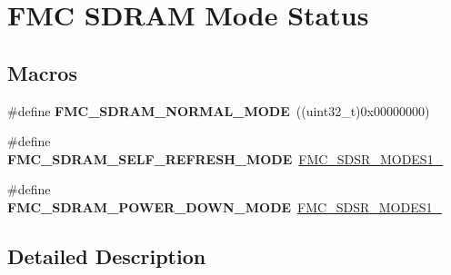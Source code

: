 \hypertarget{group___f_m_c___s_d_r_a_m___mode___status}{}\section{F\+MC S\+D\+R\+AM Mode Status}
\label{group___f_m_c___s_d_r_a_m___mode___status}
\subsection*{Macros}
\begin{DoxyCompactItemize}
\item 
\#define {\bfseries F\+M\+C\+\_\+\+S\+D\+R\+A\+M\+\_\+\+N\+O\+R\+M\+A\+L\+\_\+\+M\+O\+DE}~((uint32\+\_\+t)0x00000000)\hypertarget{group___f_m_c___s_d_r_a_m___mode___status_gab9ee9b57cae6b0db11b17d9ac798d741}{}\label{group___f_m_c___s_d_r_a_m___mode___status_gab9ee9b57cae6b0db11b17d9ac798d741}

\item 
\#define {\bfseries F\+M\+C\+\_\+\+S\+D\+R\+A\+M\+\_\+\+S\+E\+L\+F\+\_\+\+R\+E\+F\+R\+E\+S\+H\+\_\+\+M\+O\+DE}~\hyperlink{group___peripheral___registers___bits___definition_ga3cfebd747cc0903d32a7e34e498ae665}{F\+M\+C\+\_\+\+S\+D\+S\+R\+\_\+\+M\+O\+D\+E\+S1\+\_}\hypertarget{group___f_m_c___s_d_r_a_m___mode___status_ga52e55ef672c1038b560927fffc99d87d}{}\label{group___f_m_c___s_d_r_a_m___mode___status_ga52e55ef672c1038b560927fffc99d87d}

\item 
\#define {\bfseries F\+M\+C\+\_\+\+S\+D\+R\+A\+M\+\_\+\+P\+O\+W\+E\+R\+\_\+\+D\+O\+W\+N\+\_\+\+M\+O\+DE}~\hyperlink{group___peripheral___registers___bits___definition_ga3fd27fa69758aa02dec28e01b79ffc2e}{F\+M\+C\+\_\+\+S\+D\+S\+R\+\_\+\+M\+O\+D\+E\+S1\+\_}\hypertarget{group___f_m_c___s_d_r_a_m___mode___status_gaddad58a9df73cd00b183cd1e55d179ee}{}\label{group___f_m_c___s_d_r_a_m___mode___status_gaddad58a9df73cd00b183cd1e55d179ee}

\end{DoxyCompactItemize}


\subsection{Detailed Description}
